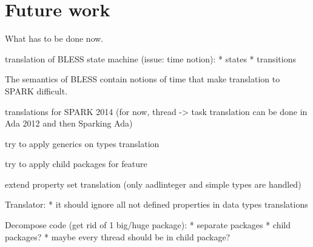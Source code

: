 
\cleardoublepage

\chapter{Future work}
\label{future_work}

What has to be done now.

translation of BLESS state machine (issue: time notion):
	* states
	* transitions

The semantics of BLESS contain notions of time that make translation to SPARK difficult.

translations for SPARK 2014 (for now, thread -> task translation can be done in Ada 2012 and then Sparking Ada)

try to apply generics on types translation

try to apply child packages for feature 

extend property set translation (only aadlinteger and simple types are handled)

Translator:
* it should ignore all not defined properties in data types translations

Decompose code (get rid of 1 big/huge package):
* separate packages
* child packages?
* maybe every thread should be in child package?